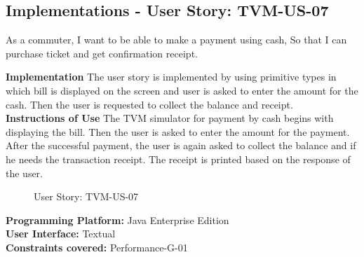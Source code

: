 \documentclass[a4paper,12pt]{report}
\begin{document}
\FloatBarrier
\vspace{0.5cm}
\subsection{Implementations - User Story: TVM-US-07}
As a commuter, I want to be able to make a payment using cash, So that I can purchase ticket and get confirmation receipt.

\begin{flushleft}
	\textbf{Implementation}
	The user story is implemented by using primitive types in which bill is displayed on the screen and user is asked to enter the amount for the cash. Then the user is requested to collect the balance and receipt. \\
	
	\textbf{Instructions of Use}
	The TVM simulator for payment by cash begins with displaying the bill. Then the user is asked to enter the amount for the payment. After the successful payment, the user is again asked to collect the balance and if he needs the transaction receipt. The receipt is printed based on the response of the user.
	
	\begin{figure}[!htb]
		\caption{\label{fig:tvm07}User Story: TVM-US-07}	
	\end{figure} 
	
	\vspace{0.5cm}
	\textbf{Programming Platform: } Java Enterprise Edition \\
	\textbf{User Interface:} Textual \\
	\textbf{Constraints covered:} Performance-G-01 \\
	

\end{flushleft}
\end{document}
